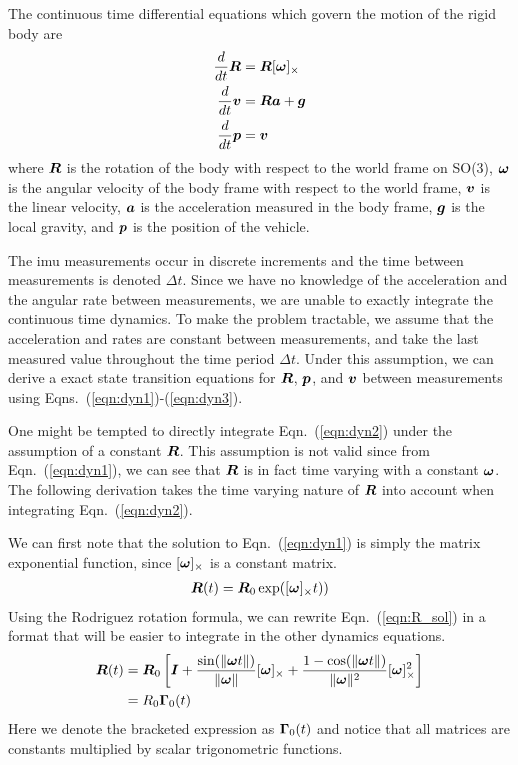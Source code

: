 The continuous time differential equations which govern the motion of the rigid body are
\begin{align}
    \frac{d}{dt}\boldsymbol{R} &= \boldsymbol{R}[\boldsymbol{\omega}]_\times \label{eqn:dyn1}\\
    \frac{d}{dt}\boldsymbol{v} &= \boldsymbol{R}\boldsymbol{a} + \boldsymbol{g} \label{eqn:dyn2}\\
    \frac{d}{dt}\boldsymbol{p} &= \boldsymbol{v} \label{eqn:dyn3}
\end{align}
where $\boldsymbol{R}$ is the rotation of the body with respect to the world frame on SO(3), $\boldsymbol{\omega}$ is the angular velocity of the body frame with respect to the world frame, $\boldsymbol{v}$ is the linear velocity, $\boldsymbol{a}$ is the acceleration measured in the body frame, $\boldsymbol{g}$ is the local gravity, and $\boldsymbol{p}$ is the position of the vehicle.

The imu measurements occur in discrete increments and the time between measurements is denoted $\Delta t$. Since we have no knowledge of the acceleration and the angular rate between measurements, we are unable to exactly integrate the continuous time dynamics.  To make the problem tractable, we assume that the acceleration and rates are constant between measurements, and take the last measured value throughout the time period $\Delta t$.  Under this assumption, we can derive a exact state transition equations for $\boldsymbol{R}$, $\boldsymbol{p}$, and $\boldsymbol{v}$ between measurements using Eqns.~(\ref{eqn:dyn1})-(\ref{eqn:dyn3}).

One might be tempted to directly integrate Eqn.~(\ref{eqn:dyn2}) under the assumption of a constant $\boldsymbol{R}$.  This assumption is not valid since from Eqn.~(\ref{eqn:dyn1}), we can see that $\boldsymbol{R}$ is in fact time varying with a constant $\boldsymbol{\omega}$.  The following derivation takes the time varying nature of $\boldsymbol{R}$ into account when integrating Eqn.~(\ref{eqn:dyn2}).

We can first note that the solution to Eqn.~(\ref{eqn:dyn1}) is simply the matrix exponential function, since $[\boldsymbol{\omega}]_\times$ is a constant matrix.
\begin{align}
    \boldsymbol{R}(t) = \boldsymbol{R}_0\exp([\boldsymbol{\omega}]_\times t) \label{eqn:R_sol})
\end{align}
Using the Rodriguez rotation formula, we can rewrite Eqn.~(\ref{eqn:R_sol}) in a format that will be easier to integrate in the other dynamics equations.
\begin{align}
    \boldsymbol{R}(t) &= \boldsymbol{R}_0 \left[\boldsymbol{I} + \frac{\sin(\Vert\boldsymbol{\omega} t\Vert)}{\Vert\boldsymbol{\omega}\Vert}[\boldsymbol{\omega}]_\times + \frac{1 - \cos(\Vert\boldsymbol{\omega} t\Vert)}{\Vert\boldsymbol{\omega}\Vert^2}[\boldsymbol{\omega}]_\times^2\right] \nonumber\\
    &= R_0 \boldsymbol{\Gamma}_0(t)
\end{align}
Here we denote the bracketed expression as $\boldsymbol{\Gamma}_0 (t)$ and notice that all matrices are constants multiplied by scalar trigonometric functions.

